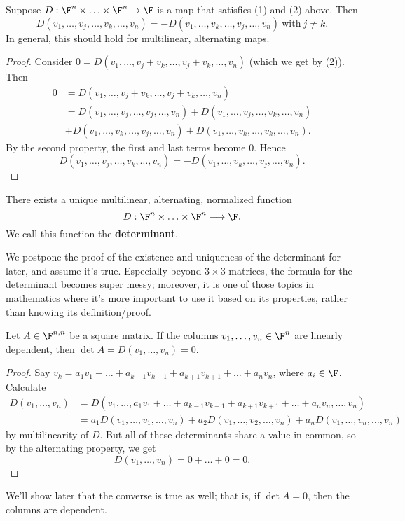 \documentclass[math0540-lecture-notes.tex]{subfiles}
\begin{document}
\begin{proposition}{}
  Suppose $D:\F^n\times \ldots\times \F^n\to \F$ is a map that satisfies (1) and (2) above. Then \[
    D(v_1,\ldots,v_j,\ldots,v_k,\ldots,v_n)=-D(v_1,\ldots,v_k,\ldots,v_j,\ldots,v_n) ~\text{with}~
    j\neq k
  .\] In general, this should hold for multilinear, alternating maps.
\end{proposition}
\begin{proof}[Proof]
  Consider $0=D(v_1,\ldots,v_j+v_k,\ldots,v_j+v_k,\ldots,v_n)$ (which we get by (2)). Then
  \begin{align*}
    0&=D(v_1,\ldots,v_j+v_k,\ldots,v_j+v_k,\ldots,v_n)\\
     &= D(v_1,\ldots,v_j,\ldots,v_j,\ldots,v_n)+D(v_1,\ldots,v_j,\ldots,v_k,\ldots,v_n) \\
     &+D(v_1,\ldots,v_k,\ldots,v_j,\ldots,v_n)+D(v_1,\ldots,v_k,\ldots,v_k,\ldots,v_n)
  .\end{align*}
  By the second property, the first and last terms become $0$. Hence \[
    D(v_1,\ldots,v_j,\ldots,v_k,\ldots,v_n)=-D(v_1,\ldots,v_k,\ldots,v_j,\ldots,v_n)
  .\] 
\end{proof}

\begin{theorem}[Determinant]{}
  There exists a unique multilinear, alternating, normalized function \[
    D:\F^n\times \ldots\times \F^n \longrightarrow \F
  .\] We call this function the \textbf{determinant}.
\end{theorem}

We postpone the proof of the existence and uniqueness of the determinant for later, and assume it's
true. Especially beyond $3\times 3$ matrices, the formula for the determinant becomes super messy;
moreover, it is one of those topics in mathematics where it's more important to use it based on its
properties, rather than knowing its definition/proof.

\begin{proposition}{}
  Let $A\in \F^{n,n}$ be a square matrix. If the columns $v_1,\ldots,v_n\in \F^n$ are linearly
  dependent, then $\det{A}=D(v_1,\ldots,v_n)=0$.
\end{proposition}
\begin{proof}[Proof]
  Say $v_k=a_1v_1+\ldots+a_{k-1}v_{k-1}+a_{k+1}v_{k+1}+\ldots+a_nv_n$, where $a_i\in \F$. Calculate
  \begin{align*}
    D(v_1,\ldots,v_n)&=
    D(v_1,\ldots,a_1v_1+\ldots+a_{k-1}v_{k-1}+a_{k+1}v_{k+1}+\ldots+a_nv_n,\ldots,v_n) \\
                     &=
 a_1D(v_1,\ldots,v_1,\ldots,v_n)+a_2D(v_1,\ldots,v_2,\ldots,v_n)+a_nD(v_1,\ldots,v_n,\ldots,v_n)
  \end{align*}
  by multilinearity of $D$. But all of these determinants share a value in common, so by the
  alternating property, we get \[
    D(v_1,\ldots,v_n)=0+\ldots+0=0
  .\] 
\end{proof}
We'll show later that the converse is true as well; that is, if $\det{A}=0$, then the columns are
dependent.
\end{document}
